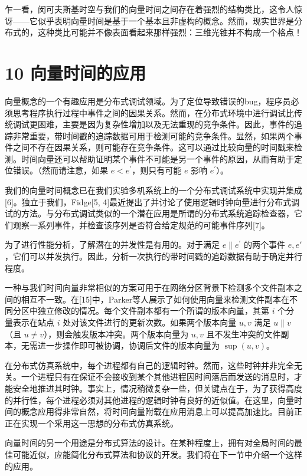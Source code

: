\documentclass[12pt,a4paper]{report} %
\begin{document}
乍一看，闵可夫斯基时空与我们的向量时间之间存在着强烈的结构类比，这令人惊讶——它似乎表明向量时间是基于一个基本且非虚构的概念。然而，现实世界是分布式的，这种类比可能并不像表面看起来那样强烈：三维光锥并不构成一个格点！

\section*{10 向量时间的应用}

向量概念的一个有趣应用是分布式调试领域。为了定位导致错误的bug，程序员必须思考程序执行过程中事件之间的因果关系。然而，在分布式环境中进行调试比传统调试更困难，主要是因为复杂性增加以及无法重现的竞争条件。因此，事件的追踪非常重要，带时间戳的追踪数据可用于检测可能的竞争条件。显然，如果两个事件之间不存在因果关系，则可能存在竞争条件。这可以通过比较向量的时间戳来检测。时间向量还可以帮助证明某个事件不可能是另一个事件的原因，从而有助于定位错误。（然而请注意，如果 $e<e^{\prime}$，则只有可能 $e$ 影响 $e^{\prime}$）。

我们的向量时间概念已在我们实验多机系统上的一个分布式调试系统中实现并集成[6]。独立于我们，Fidge[5, 4]最近提出了并讨论了使用逻辑时钟向量进行分布式调试的方法。与分布式调试类似的一个潜在应用是所谓的分布式系统追踪检查器，它们观察一系列事件，并检查该序列是否符合给定规范的可能事件序列[7]。

为了进行性能分析，了解潜在的并发性是有用的。对于满足 $e \| e^{\prime}$ 的两个事件 $e, e'$，它们可以并发执行。因此，分析一次执行的带时间戳的追踪数据有助于确定并行程度。

一种与我们时间向量非常相似的方案可用于在网络分区背景下检测多个文件副本之间的相互不一致。在[15]中，Parker等人展示了如何使用向量来检测文件副本在不同分区中独立修改的情况。每个文件副本都有一个所谓的版本向量，其第 $i$ 个分量表示在站点 $i$ 处对该文件进行的更新次数。如果两个版本向量 $u, v$ 满足 $u \| v$（且 $u \neq v$），则会触发版本冲突。两个版本向量为 $u, v$ 且不发生冲突的文件副本，无需进一步操作即可被协调，协调后文件的版本向量为 $\sup(u, v)$。

在分布式仿真系统中，每个进程都有自己的逻辑时钟。然而，这些时钟并非完全无关。一个进程只有在保证不会接收到某个其他进程因时间落后而发送的消息时，才能安全地推进其时钟。事实上，情况稍微复杂一些，但关键点在于，为了获得高度的并行性，每个进程必须对其他进程的逻辑时钟有良好的近似值。在这里，向量时间的概念应用得非常自然，将时间向量附载在应用消息上可以提高加速比。目前正正在实现一个采用这一思想的分布式仿真系统。

向量时间的另一个用途是分布式算法的设计。在某种程度上，拥有对全局时间的最佳可能近似，应能简化分布式算法和协议的开发。我们将在下一节中介绍一个这样的应用。
\end{document}
